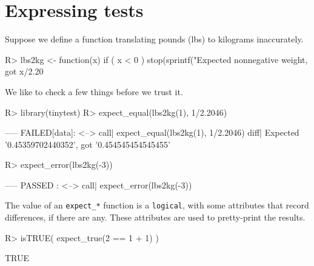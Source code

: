 \documentclass[11pt]{article}
\newcommand{\code}[1]{\texttt{#1}}
\begin{document}
\section{Expressing tests}
Suppose we define a function translating pounds (lbs) to kilograms inaccurately.
\begin{Schunk}
\begin{Sinput}
R>  lbs2kg <- function(x){
      if ( x < 0 ){
        stop(sprintf("Expected nonnegative weight, got %
      }
      x/2.20
    }
\end{Sinput}
\end{Schunk}
We like to check a few things before we trust it.
\begin{Schunk}
\begin{Sinput}
R>  library(tinytest)
R>  expect_equal(lbs2kg(1), 1/2.2046)
\end{Sinput}
\begin{Soutput}
----- FAILED[data]: <-->
 call| expect_equal(lbs2kg(1), 1/2.2046)
 diff| Expected '0.45359702440352', got '0.454545454545455' 
\end{Soutput}
\begin{Sinput}
R>  expect_error(lbs2kg(-3))
\end{Sinput}
\begin{Soutput}
----- PASSED      : <-->
 call| expect_error(lbs2kg(-3)) 
\end{Soutput}
\end{Schunk}

The value of an \code{expect\_*} function is a \code{logical}, with some
attributes that record differences, if there are any. These attributes are used
to pretty-print the results.
\begin{Schunk}
\begin{Sinput}
R>  isTRUE( expect_true(2 == 1 + 1) )
\end{Sinput}
\begin{Soutput}
[1] TRUE
\end{Soutput}
\end{Schunk}
\end{document}
